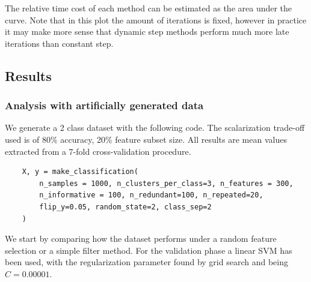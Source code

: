 The relative time cost of each method can be estimated as the area under the curve. Note that in this plot the amount of iterations is fixed, however in practice it may make more sense that dynamic step methods perform much more late iterations than constant step.

\subsection{Results}

\subsubsection*{Analysis with artificially generated data}

We generate a 2 class dataset with the following code. The scalarization trade-off used is of 80\% accuracy, 20\% feature subset size. All results are mean values extracted from a 7-fold cross-validation procedure.

\begin{verbatim}
    X, y = make_classification(
        n_samples = 1000, n_clusters_per_class=3, n_features = 300,
        n_informative = 100, n_redundant=100, n_repeated=20,
        flip_y=0.05, random_state=2, class_sep=2
    )
\end{verbatim}

We start by comparing how the dataset performs under a random feature se\-lec\-tion or a simple filter method. For the validation phase a linear SVM has been used, with the regularization parameter found by grid search and being $C = 0.00001$.

